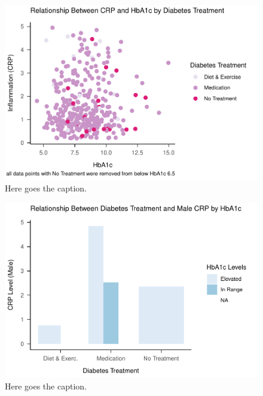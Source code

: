 \documentclass[
  man]{apa6}
\begin{document}
\begin{figure}
\centering
\includegraphics{NEW_Final_Groupof5_files/figure-latex/tian-fig-hba1c-65-1.pdf}
\caption{\label{fig:tian-fig-hba1c-65}Here goes the caption.}
\end{figure}



\begin{figure}
\centering
\includegraphics{NEW_Final_Groupof5_files/figure-latex/crp-by-sex-male-1.pdf}
\caption{\label{fig:crp-by-sex-male}Here goes the caption.}
\end{figure}
\end{document}
